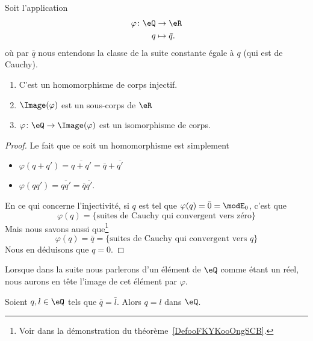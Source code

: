 \begin{proposition}     \label{PropooEPFCooMtDOfP}
	Soit l'application
	\begin{equation}
		\begin{aligned}
			\varphi\colon \eQ & \to \eR          \\
			q                 & \mapsto \bar q .
		\end{aligned}
	\end{equation}
	où par \( \bar q\) nous entendons la classe de la suite constante égale à \( q\) (qui est de Cauchy).
	\begin{enumerate}
		\item
		      C'est un homomorphisme de corps injectif.
		\item
		      \( \Image(\varphi)\) est un sous-corps de \( \eR\)
		\item
		      \( \varphi\colon \eQ\to \Image(\varphi)\) est un isomorphisme de corps.
	\end{enumerate}
\end{proposition}

\begin{proof}
	Le fait que ce soit un homomorphisme est simplement
	\begin{itemize}
		\item \( \varphi(q+q')=\overline{ q+q' }=\bar q+\overline{ q' }\)
		\item \( \varphi(qq')=\overline{ qq' }=\overline{ q }\overline{ q' }\).
	\end{itemize}
	En ce qui concerne l'injectivité, si \( q\) est tel que \( \varphi(q)=\bar 0=\modE_0\), c'est que
	\begin{equation}
		\varphi(q)=\{ \text{suites de Cauchy qui convergent vers zéro} \}
	\end{equation}
	Mais nous savons aussi que\footnote{Voir dans la démonstration du théorème~\ref{DefooFKYKooOngSCB}.}
	\begin{equation}
		\varphi(q)=\bar q=\{ \text{suites de Cauchy qui convergent vers } q \}
	\end{equation}
	Nous en déduisons que \( q=0\).
\end{proof}
Lorsque dans la suite nous parlerons d'un élément de \( \eQ\) comme étant un réel, nous aurons en tête l'image de cet élément par \( \varphi\).

\begin{lemma}       \label{LEMooYLQBooFistHs}
	Soient \( q,l\in \eQ\) tels que \( \bar q=\bar l\). Alors \( q=l\) dans \( \eQ\).
\end{lemma}

